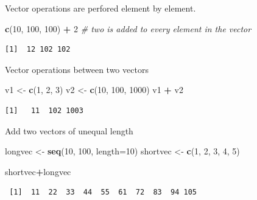 \documentclass[
]{book}
\newenvironment{Shaded}{\begin{snugshade}}{\end{snugshade}}
\newcommand{\CommentTok}[1]{\textcolor[rgb]{0.56,0.35,0.01}{\textit{#1}}}
\newcommand{\DataTypeTok}[1]{\textcolor[rgb]{0.13,0.29,0.53}{#1}}
\newcommand{\DecValTok}[1]{\textcolor[rgb]{0.00,0.00,0.81}{#1}}
\newcommand{\KeywordTok}[1]{\textcolor[rgb]{0.13,0.29,0.53}{\textbf{#1}}}
\newcommand{\NormalTok}[1]{#1}
\newcommand{\OperatorTok}[1]{\textcolor[rgb]{0.81,0.36,0.00}{\textbf{#1}}}
\newcommand{\StringTok}[1]{\textcolor[rgb]{0.31,0.60,0.02}{#1}}
\begin{document}
Vector operations are perfored element by element.

\begin{Shaded}
\begin{Highlighting}[]
\KeywordTok{c}\NormalTok{(}\DecValTok{10}\NormalTok{, }\DecValTok{100}\NormalTok{, }\DecValTok{100}\NormalTok{) }\OperatorTok{+}\StringTok{ }\DecValTok{2} \CommentTok{# two is added to every element in the vector}
\end{Highlighting}
\end{Shaded}

\begin{verbatim}
[1]  12 102 102
\end{verbatim}

Vector operations between two vectors

\begin{Shaded}
\begin{Highlighting}[]
\NormalTok{v1 <-}\StringTok{ }\KeywordTok{c}\NormalTok{(}\DecValTok{1}\NormalTok{, }\DecValTok{2}\NormalTok{, }\DecValTok{3}\NormalTok{)}
\NormalTok{v2 <-}\StringTok{ }\KeywordTok{c}\NormalTok{(}\DecValTok{10}\NormalTok{, }\DecValTok{100}\NormalTok{, }\DecValTok{1000}\NormalTok{)}
\NormalTok{v1 }\OperatorTok{+}\StringTok{ }\NormalTok{v2}
\end{Highlighting}
\end{Shaded}

\begin{verbatim}
[1]   11  102 1003
\end{verbatim}

Add two vectors of unequal length

\begin{Shaded}
\begin{Highlighting}[]
\NormalTok{longvec <-}\StringTok{ }\KeywordTok{seq}\NormalTok{(}\DecValTok{10}\NormalTok{, }\DecValTok{100}\NormalTok{, }\DataTypeTok{length=}\DecValTok{10}\NormalTok{)}
\NormalTok{shortvec <-}\StringTok{ }\KeywordTok{c}\NormalTok{(}\DecValTok{1}\NormalTok{, }\DecValTok{2}\NormalTok{, }\DecValTok{3}\NormalTok{, }\DecValTok{4}\NormalTok{, }\DecValTok{5}\NormalTok{)}

\NormalTok{shortvec}\OperatorTok{+}\NormalTok{longvec}
\end{Highlighting}
\end{Shaded}

\begin{verbatim}
 [1]  11  22  33  44  55  61  72  83  94 105
\end{verbatim}
\end{document}
